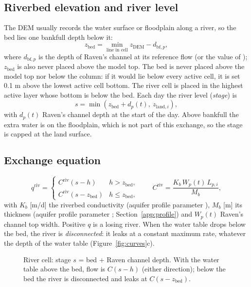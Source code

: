 \subsection{Riverbed elevation and river level}
The DEM usually records the water surface or floodplain along a river, so the bed lies one bankfull depth below it:
\begin{equation}
z_{\mathrm{bed}}=\min_{\text{line in cell}}z_{\mathrm{DEM}}-d_{\mathrm{bf},p},
\end{equation}
where $d_{\mathrm{bf},p}$ is the depth of Raven's channel at its reference flow (or the value of );
$z_{\mathrm{bed}}$ is also never placed above the model top.
The bed is never placed above the model top nor below the column: if it would lie below every active cell, it is set
0.1 m above the lowest active cell bottom. The river cell is placed in the highest active layer whose bottom is below the
bed. Each day the river level (\emph{stage}) is
\begin{equation}
s=\min\!\left(z_{\mathrm{bed}}+d_p(t),\ z_{\mathrm{land},i}\right),
\end{equation}
with $d_p(t)$ Raven's channel depth at the start of the day. Above bankfull the extra water is on the floodplain, which
is not part of this exchange, so the stage is capped at the land surface.

\subsection{Exchange equation}
\begin{equation}
q^{\mathrm{riv}}=\begin{cases}C^{\mathrm{riv}}\left(s-h\right) & h>z_{\mathrm{bed}},\\
C^{\mathrm{riv}}\left(s-z_{\mathrm{bed}}\right) & h\le z_{\mathrm{bed}},\end{cases}
\qquad C^{\mathrm{riv}}=\frac{K_b\,W_p(t)\,L_{p,i}}{M_b},
\end{equation}
with $K_b$ [m/d] the riverbed conductivity (aquifer profile parameter ), $M_b$ [m] its thickness (aquifer profile parameter ; Section~\ref{app:profile}) and $W_p(t)$
Raven's channel top width. Positive $q$ is a losing river. When the water table drops below the bed, the river is
\emph{disconnected}: it leaks at a constant maximum rate, whatever the depth of the water table
(Figure~\ref{fig:curves}c).

\begin{figure}[!htbp]\centering

\caption{River cell: stage $s$ = bed + Raven channel depth. With the water table above the bed, flow is $C(s-h)$ (either
direction); below the bed the river is disconnected and leaks at $C(s-z_{\mathrm{bed}})$.}\label{fig:river}
\end{figure}

